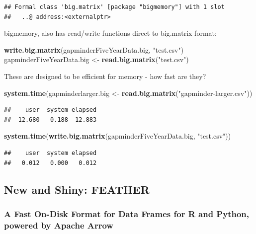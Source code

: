 \documentclass[]{article}
\newenvironment{Shaded}{\begin{snugshade}}{\end{snugshade}}
\newcommand{\KeywordTok}[1]{\textcolor[rgb]{0.13,0.29,0.53}{\textbf{{#1}}}}
\newcommand{\StringTok}[1]{\textcolor[rgb]{0.31,0.60,0.02}{{#1}}}
\newcommand{\NormalTok}[1]{{#1}}
\begin{document}
\begin{verbatim}
## Formal class 'big.matrix' [package "bigmemory"] with 1 slot
##   ..@ address:<externalptr>
\end{verbatim}

bigmemory, also has read/write functions direct to big.matrix format:

\begin{Shaded}
\begin{Highlighting}[]
\KeywordTok{write.big.matrix}\NormalTok{(gapminderFiveYearData.big, }\StringTok{"test.csv"}\NormalTok{)}
\NormalTok{gapminderFiveYearData.big <-}\StringTok{ }\KeywordTok{read.big.matrix}\NormalTok{(}\StringTok{"test.csv"}\NormalTok{)}
\end{Highlighting}
\end{Shaded}

These are designed to be efficient for memory - how fast are they?

\begin{Shaded}
\begin{Highlighting}[]
\KeywordTok{system.time}\NormalTok{(gapminderlarger.big <-}\StringTok{ }\KeywordTok{read.big.matrix}\NormalTok{(}\StringTok{"gapminder-larger.csv"}\NormalTok{))}
\end{Highlighting}
\end{Shaded}

\begin{verbatim}
##    user  system elapsed 
##  12.680   0.188  12.883
\end{verbatim}

\begin{Shaded}
\begin{Highlighting}[]
\KeywordTok{system.time}\NormalTok{(}\KeywordTok{write.big.matrix}\NormalTok{(gapminderFiveYearData.big, }\StringTok{"test.csv"}\NormalTok{))}
\end{Highlighting}
\end{Shaded}

\begin{verbatim}
##    user  system elapsed 
##   0.012   0.000   0.012
\end{verbatim}

\subsection{New and Shiny: FEATHER}\label{new-and-shiny-feather}

\subsubsection{A Fast On-Disk Format for Data Frames for R and Python,
powered by Apache
Arrow}\label{a-fast-on-disk-format-for-data-frames-for-r-and-python-powered-by-apache-arrow}
\end{document}
